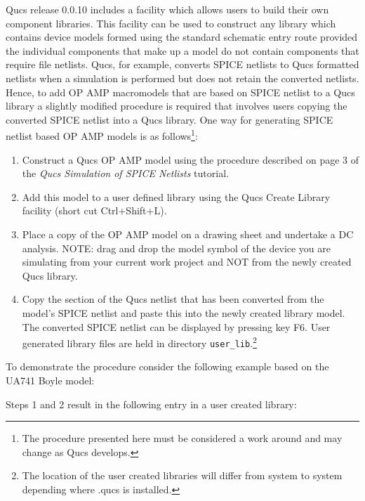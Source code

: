 Qucs release 0.0.10 includes a facility which allows users to build their own component libraries. This facility can be used to construct any library which contains device models formed using the standard schematic entry route provided the individual components that make up a model do not contain components that require file netlists.  Qucs, for example, converts SPICE netlists to Qucs formatted netlists when a  simulation is performed but does not retain the converted netlists. Hence, to add OP AMP macromodels that are based on SPICE netlist to a Qucs library a slightly modified procedure is required that involves users copying the converted SPICE netlist into a Qucs library.  One way for generating SPICE netlist based OP AMP models is as follows\footnote{The procedure presented here must be considered a work around and may change as Qucs develops.}:
\begin{enumerate}
 \item Construct a Qucs OP AMP model using the procedure described on page 3 of the \textit{Qucs Simulation of SPICE Netlists} tutorial.
 \item Add this model to a user defined library using the Qucs Create Library facility (short cut Ctrl+Shift+L).
 \item Place a copy of the OP AMP model on a drawing sheet and undertake a DC analysis. NOTE: drag and drop the model symbol of the device you are simulating from your current work project and NOT from the newly created Qucs library.
 \item Copy the section of the Qucs netlist that has been converted from the model's SPICE netlist and paste this into the newly created library model. The converted SPICE netlist can be displayed by pressing key F6. User generated library files are held in directory \verb|user_lib|.\footnote{The location of the user created libraries will differ from system to system depending where .qucs is installed.}
\end{enumerate}

 To demonstrate the procedure consider the following example based on the UA741 Boyle model:

 Steps 1 and 2 result in the following entry in a user created library:

